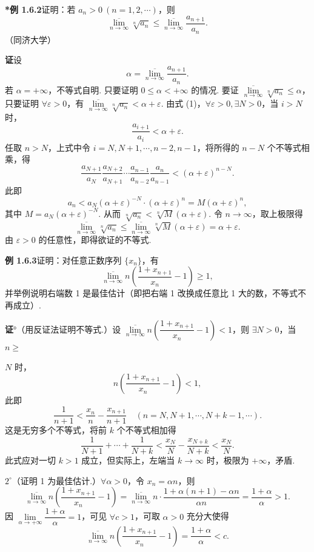 \documentclass[UTF8,12pt,a4paper,fontset=fandol]{ctexart}
\begin{document}
\noindent\textbf{*例 1.6.2}\quad 证明：若 $a_n>0\ (n=1,2,\cdots)$，则
\[
  \overline{\lim_{n\to\infty}}\sqrt[n]{a_n}\le \overline{\lim_{n\to\infty}}\frac{a_{n+1}}{a_n}.
\]
（同济大学）

\noindent\textbf{证}\quad 设
\[
  \alpha=\overline{\lim_{n\to\infty}}\frac{a_{n+1}}{a_n}.
\tag{1}
\]
若 $\alpha=+\infty$，不等式自明. 只要证明 $0\le\alpha<+\infty$ 的情况. 要证 $\overline{\lim\limits_{n\to\infty}}\sqrt[n]{a_n}\le \alpha$，只要证明 $\forall \varepsilon>0$，有 $\overline{\lim\limits_{n\to\infty}}\sqrt[n]{a_n}<\alpha+\varepsilon$. 由式 (1)，$\forall \varepsilon>0,\exists N>0$，当 $i>N$ 时，
\[
  \frac{a_{i+1}}{a_i}<\alpha+\varepsilon.
\tag{2}
\]
任取 $n>N$，上式中令 $i=N,N+1,\cdots,n-2,n-1$，将所得的 $n-N$ 个不等式相乘，得
\[
  \frac{a_{N+1}}{a_N}\frac{a_{N+2}}{a_{N+1}}\cdots \frac{a_{n-1}}{a_{n-2}}\frac{a_n}{a_{n-1}}<(\alpha+\varepsilon)^{n-N}.
\]
此即
\[
  a_n<a_N(\alpha+\varepsilon)^{-N}\cdot(\alpha+\varepsilon)^n=M(\alpha+\varepsilon)^n,
\]
其中 $M=a_N(\alpha+\varepsilon)^{-N}$. 从而 $\sqrt[n]{a_n}<\sqrt[n]{M}(\alpha+\varepsilon)$. 令 $n\to\infty$，取上极限得
\[
  \overline{\lim_{n\to\infty}}\sqrt[n]{a_n}\le \overline{\lim_{n\to\infty}}\sqrt[n]{M}(\alpha+\varepsilon)=\alpha+\varepsilon.
\]
由 $\varepsilon>0$ 的任意性，即得欲证的不等式.

\noindent\textbf{例 1.6.3}\quad 证明：对任意正数序列 $\{x_n\}$，有
\[
  \overline{\lim_{n\to\infty}}n\left(\frac{1+x_{n+1}}{x_n}-1\right)\ge 1,
\]
并举例说明右端数 1 是最佳估计（即把右端 1 改换成任意比 1 大的数，不等式不再成立）.

\noindent\textbf{证}°（用反证法证明不等式.）设 $\overline{\lim\limits_{n\to\infty}}n\left(\dfrac{1+x_{n+1}}{x_n}-1\right)<1$，则 $\exists N>0$，当 $n\ge$

$N$ 时，
\[
  n\left(\frac{1+x_{n+1}}{x_n}-1\right)<1,
\]
此即
\[
  \frac1{n+1}<\frac{x_n}{n}-\frac{x_{n+1}}{n+1}\quad (n=N,N+1,\cdots,N+k-1,\cdots).
\]
这是无穷多个不等式，将前 $k$ 个不等式相加得
\[
  \frac1{N+1}+\cdots+\frac1{N+k}
  <\frac{x_N}{N}-\frac{x_{N+k}}{N+k}<\frac{x_N}{N}.
\]
此式应对一切 $k>1$ 成立，但实际上，左端当 $k\to\infty$ 时，极限为 $+\infty$，矛盾.

$2^\circ$（证明 1 为最佳估计.）$\forall \alpha>0$，令 $x_n=\alpha n$，则
\[
  \overline{\lim_{n\to\infty}}n\left(\frac{1+x_{n+1}}{x_n}-1\right)
  =\overline{\lim_{n\to\infty}}n\cdot\frac{1+\alpha(n+1)-\alpha n}{\alpha n}
  =\frac{1+\alpha}{\alpha}>1.
\]
因 $\lim\limits_{\alpha\to+\infty}\dfrac{1+\alpha}{\alpha}=1$，可见 $\forall c>1$，可取 $\alpha>0$ 充分大使得
\[
  \overline{\lim_{n\to\infty}}n\left(\frac{1+x_{n+1}}{x_n}-1\right)
  =\frac{1+\alpha}{\alpha}<c.
\]
\end{document}

